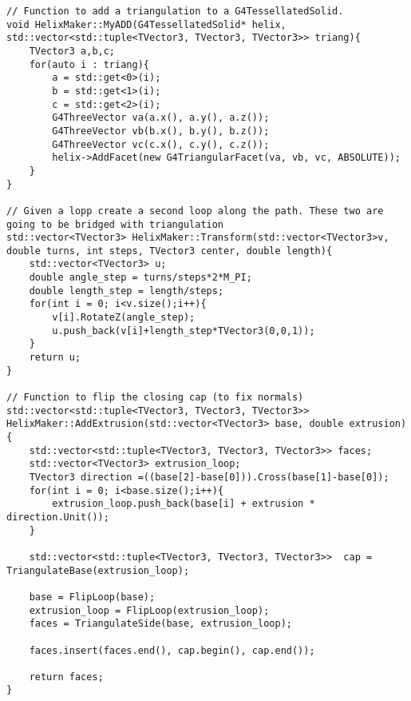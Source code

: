 \newpage
\begin{lstlisting}
// Function to add a triangulation to a G4TessellatedSolid.
void HelixMaker::MyADD(G4TessellatedSolid* helix, std::vector<std::tuple<TVector3, TVector3, TVector3>> triang){
	TVector3 a,b,c;
	for(auto i : triang){
		a = std::get<0>(i);
		b = std::get<1>(i);
		c = std::get<2>(i);
		G4ThreeVector va(a.x(), a.y(), a.z());
        G4ThreeVector vb(b.x(), b.y(), b.z());
        G4ThreeVector vc(c.x(), c.y(), c.z());
        helix->AddFacet(new G4TriangularFacet(va, vb, vc, ABSOLUTE));
	}
}

// Given a lopp create a second loop along the path. These two are going to be bridged with triangulation
std::vector<TVector3> HelixMaker::Transform(std::vector<TVector3>v, double turns, int steps, TVector3 center, double length){
    std::vector<TVector3> u;
    double angle_step = turns/steps*2*M_PI;
    double length_step = length/steps;
    for(int i = 0; i<v.size();i++){
        v[i].RotateZ(angle_step);
        u.push_back(v[i]+length_step*TVector3(0,0,1));
    }
    return u;
}

// Function to flip the closing cap (to fix normals)
std::vector<std::tuple<TVector3, TVector3, TVector3>> HelixMaker::AddExtrusion(std::vector<TVector3> base, double extrusion){
    std::vector<std::tuple<TVector3, TVector3, TVector3>> faces;
    std::vector<TVector3> extrusion_loop;
    TVector3 direction =((base[2]-base[0])).Cross(base[1]-base[0]);
    for(int i = 0; i<base.size();i++){
        extrusion_loop.push_back(base[i] + extrusion * direction.Unit());
    }

    std::vector<std::tuple<TVector3, TVector3, TVector3>>  cap = TriangulateBase(extrusion_loop);

    base = FlipLoop(base);
    extrusion_loop = FlipLoop(extrusion_loop);
    faces = TriangulateSide(base, extrusion_loop);

    faces.insert(faces.end(), cap.begin(), cap.end());

    return faces;
}

\end{lstlisting}